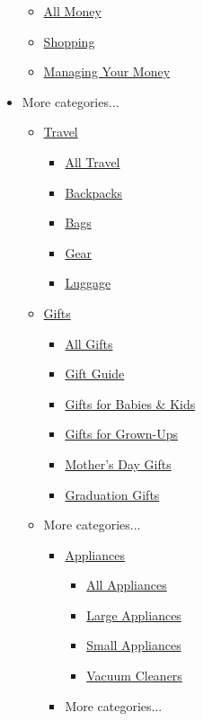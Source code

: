 \begin{itemize}
  \begin{itemize}
  \tightlist
  \item
    \href{/wirecutter/money/}{All Money}
  \item
    \href{/wirecutter/money/shopping/}{Shopping}
  \item
    \href{/wirecutter/money/managing-money/}{Managing Your Money}
  \end{itemize}
\item
  More categories...

  \begin{itemize}
  \tightlist
  \item
    \href{/wirecutter/travel/}{Travel}

    \begin{itemize}
    \tightlist
    \item
      \href{/wirecutter/travel/}{All Travel}
    \item
      \href{/wirecutter/travel/backpacks/}{Backpacks}
    \item
      \href{/wirecutter/travel/bags/}{Bags}
    \item
      \href{/wirecutter/travel/gear-travel/}{Gear}
    \item
      \href{/wirecutter/travel/luggage/}{Luggage}
    \end{itemize}
  \item
    \href{/wirecutter/gifts/}{Gifts}

    \begin{itemize}
    \tightlist
    \item
      \href{/wirecutter/gifts/}{All Gifts}
    \item
      \href{/wirecutter/gifts/guide/}{Gift Guide}
    \item
      \href{/wirecutter/gifts/kids/}{Gifts for Babies \& Kids}
    \item
      \href{/wirecutter/gifts/adults/}{Gifts for Grown-Ups}
    \item
      \href{/wirecutter/gifts/mothers-day/}{Mother's Day Gifts}
    \item
      \href{/wirecutter/gifts/graduation/}{Graduation Gifts}
    \end{itemize}
  \item
    More categories...

    \begin{itemize}
    \tightlist
    \item
      \href{/wirecutter/appliances/}{Appliances}

      \begin{itemize}
      \tightlist
      \item
        \href{/wirecutter/appliances/}{All Appliances}
      \item
        \href{/wirecutter/appliances/large/}{Large Appliances}
      \item
        \href{/wirecutter/appliances/small/}{Small Appliances}
      \item
        \href{/wirecutter/appliances/vacuums/}{Vacuum Cleaners}
      \end{itemize}
    \item
      More categories...


\end{itemize}
\end{itemize}
\end{itemize}

